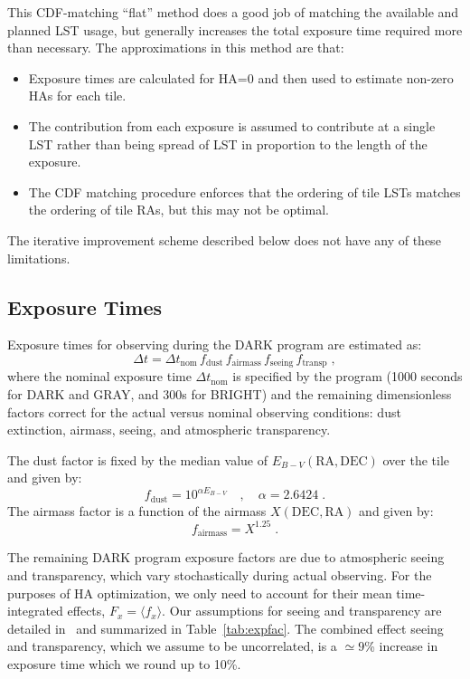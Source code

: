 \documentclass[12pt]{article}
\providecommand{\tab}[1]{Table~\ref{tab:#1}}
\begin{document}
This CDF-matching ``flat'' method does a good job of matching the available and planned LST usage, but generally increases the total exposure time required more than necessary. The approximations in this method are that:
\begin{itemize}
    \item Exposure times are calculated for HA=0 and then used to estimate non-zero HAs for each tile.
    \item The contribution from each exposure is assumed to contribute at a single LST rather than being spread of LST in proportion to the length of the exposure.
    \item The CDF matching procedure enforces that the ordering of tile LSTs matches the ordering of tile RAs, but this may not be optimal.
\end{itemize}
The iterative improvement scheme described below does not have any of these limitations.

\subsection{Exposure Times}

Exposure times for observing during the DARK program are estimated as:
$$
\Delta t = \Delta t_{\text{nom}}\, f_{\text{dust}}\, f_{\text{airmass}}\,
f_{\text{seeing}}\, f_{\text{transp}} \; ,
$$
where the nominal exposure time $\Delta t_{\text{nom}}$ is specified by the program (1000 seconds for DARK and GRAY, and 300s for BRIGHT) and the remaining dimensionless factors correct for the actual versus nominal observing conditions: dust extinction, airmass, seeing, and atmospheric transparency.

The dust factor is fixed by the median value of $E_{B-V}(\text{RA}, \text{DEC})$ over the tile and given by:
$$
f_{\text{dust}} = 10^{\alpha E_{B-V}}
\quad, \quad \alpha = 2.6424 \; .
$$
The airmass factor is a function of the airmass $X(\text{DEC}, \text{RA})$ and given by:
$$
f_{\text{airmass}} = X^{1.25} \; .
$$

The remaining DARK program exposure factors are due to atmospheric seeing and transparency, which vary stochastically during actual observing. For the purposes of HA optimization, we only need to account for their mean time-integrated effects, $F_x = \langle f_x\rangle$.  Our assumptions for seeing and transparency are detailed in~\cite{desi-3087} and summarized in \tab{expfac}. The combined effect seeing and transparency, which we assume to be uncorrelated, is a $\simeq 9$\% increase in exposure time which we
round up to 10\%.
\end{document}

